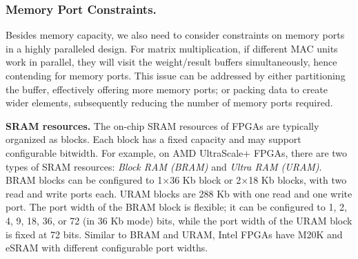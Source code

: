 \subsubsection{Memory Port Constraints.}
\label{subsubsec:memory_port}
Besides memory capacity, we also need to consider constraints on memory ports in a highly paralleled design.
For matrix multiplication, if different MAC units
work in parallel, they will visit the weight/result buffers simultaneously, hence contending for memory ports.
This issue can be addressed by either partitioning the buffer, effectively offering more memory ports; or packing data to create wider elements, subsequently reducing the number of memory ports required.

\textbf{SRAM resources.}
The on-chip SRAM resources of FPGAs are typically organized as blocks. 
Each block has a fixed capacity and may support configurable bitwidth.
For example, on AMD UltraScale+ FPGAs, there are two types of SRAM resources: \emph{Block RAM (BRAM)} and \emph{Ultra RAM (URAM)}.
BRAM blocks can be configured to 1$\times$36 Kb block or 2$\times$18 Kb blocks, with two read and write ports each.
URAM blocks are 288 Kb with one read and one write port.
The port width of the BRAM block is flexible; it can be configured to 1, 2, 4, 9, 18, 36, or 72 (in 36 Kb mode) bits, while the port width of the URAM block is fixed at 72 bits.
Similar to BRAM and URAM, Intel FPGAs have M20K and eSRAM with different configurable port widths.

